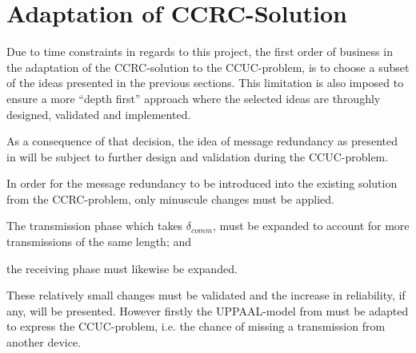 \section{Adaptation of CCRC-Solution} %
\label{sec:adaptation_of_ccrc_solution}
Due to time constraints in regards to this project, the first order of business in the adaptation of the CCRC-solution to the CCUC-problem, is to choose a subset of the ideas presented in the previous sections.
This limitation is also imposed to ensure a more ``depth first'' approach where the selected ideas are throughly designed, validated and implemented.

As a consequence of that decision, the idea of message redundancy as presented in  will be subject to further design and validation during the CCUC-problem.

In order for the message redundancy to be introduced into the existing solution from the CCRC-problem, only minuscule changes must be applied.
\begin{enumberate}
    \item The transmission phase which takes $\delta_{comm}$, must be expanded to account for more transmissions of the same length; and
    \item the receiving phase must likewise be expanded.
\end{enumberate}
These relatively small changes must be validated and the increase in reliability, if any, will be presented.
However firstly the UPPAAL-model from  must be adapted to express the CCUC-problem, i.e. the chance of missing a transmission from another device.

